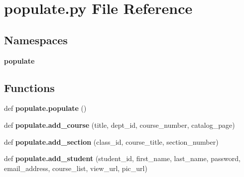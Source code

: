 \section{populate.\+py File Reference}
\label{populate_8py}
\subsection*{Namespaces}
\begin{DoxyCompactItemize}
\item 
 {\bf populate}
\end{DoxyCompactItemize}
\subsection*{Functions}
\begin{DoxyCompactItemize}
\item 
def {\bf populate.\+populate} ()
\item 
def {\bf populate.\+add\+\_\+course} (title, dept\+\_\+id, course\+\_\+number, catalog\+\_\+page)
\item 
def {\bf populate.\+add\+\_\+section} (class\+\_\+id, course\+\_\+title, section\+\_\+number)
\item 
def {\bf populate.\+add\+\_\+student} (student\+\_\+id, first\+\_\+name, last\+\_\+name, password, email\+\_\+address, course\+\_\+list, view\+\_\+url, pic\+\_\+url)
\end{DoxyCompactItemize}
